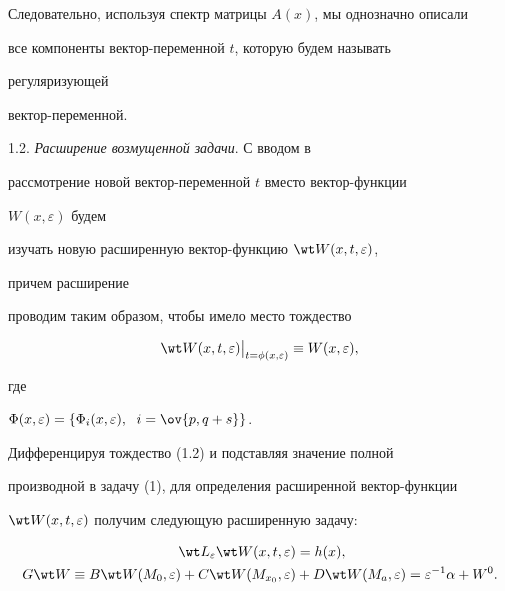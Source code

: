  


Следовательно, используя спектр матрицы $A(x)$, мы однозначно описали 


все компоненты вектор-переменной $t$, которую будем называть 


регуляризующей 


вектор-переменной. 


 


1.2. {\it Расширение возмущенной задачи}. С вводом в 


рассмотрение новой вектор-переменной $t$ вместо вектор-функции 


$W(x,\varepsilon)$ будем 


изучать новую расширенную вектор-функцию $\wt W(x,t,\varepsilon)$, 


причем расширение 


проводим таким образом, чтобы имело место тождество 


\begin{equation} 


\wt W(x,t,\varepsilon)\big|_{t=\phi(x,\varepsilon)}\equiv 


W(x,\varepsilon), 


\end{equation} 


где 


$\Phi(x,\varepsilon)=\{\Phi_i(x,\varepsilon),\ \;i=\ov{p,q+s}\}$. 


 


Дифференцируя тождество (1.2) и подставляя значение полной 


производной в задачу (1), для определения расширенной вектор-функции 


$\wt W(x,t,\varepsilon)$ получим следующую расширенную задачу: 


\begin{equation} 


\begin{split}


\wt L_\varepsilon\wt W(x,t,\varepsilon)&=h(x),\\ 


% 


G\wt W\equiv B\wt W(M_0,\varepsilon)+C\wt W(M_{x_0},\varepsilon)&+ 


D\wt W(M_a,\varepsilon)=\varepsilon^{-1}\alpha+W^0. 


\end{split} 


\end{equation}


